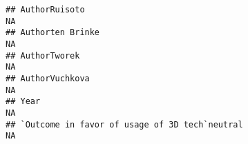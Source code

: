 \documentclass[]{article}
\begin{document}
\begin{verbatim}
## AuthorRuisoto                                                                                                                                                                                                                                                                                                                                                                                                                                                                         NA
## Authorten Brinke                                                                                                                                                                                                                                                                                                                                                                                                                                                                      NA
## AuthorTworek                                                                                                                                                                                                                                                                                                                                                                                                                                                                          NA
## AuthorVuchkova                                                                                                                                                                                                                                                                                                                                                                                                                                                                        NA
## Year                                                                                                                                                                                                                                                                                                                                                                                                                                                                                  NA
## `Outcome in favor of usage of 3D tech`neutral                                                                                                                                                                                                                                                                                                                                                                                                                                         NA

\end{verbatim}
\end{document}
